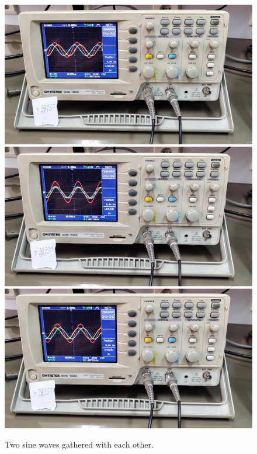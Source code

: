 \documentclass[11pt]{article}
\begin{document}
\begin{question}
{        \begin{figure}[H]
            \begin{center}
                \includegraphics[scale=0.1]{Fig/24.png}
                \includegraphics[scale=0.1]{Fig/25.png}
                \includegraphics[scale=0.1]{Fig/26.png}
                \caption{Two sine waves gathered with each other.}
            \end{center}
        \end{figure}

}
\end{question}
\end{document}
